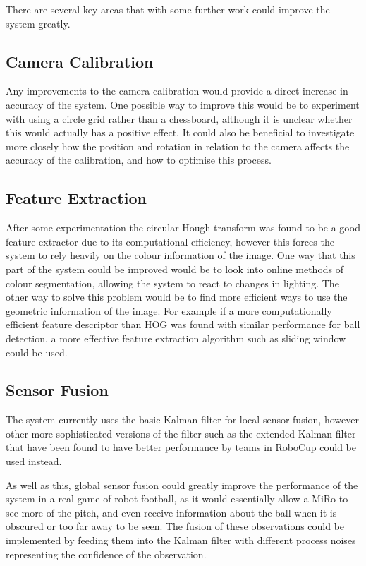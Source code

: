 There are several key areas that with some further work could improve the system greatly.

\subsection{Camera Calibration}

Any improvements to the camera calibration would provide a direct increase in accuracy of the system. One possible way to improve this would be to experiment with using a circle grid rather than a chessboard, although it is unclear whether this would actually has a positive effect. It could also be beneficial to investigate more closely how the position and rotation in relation to the camera affects the accuracy of the calibration, and how to optimise this process.

\subsection{Feature Extraction}

After some experimentation the circular Hough transform was found to be a good feature extractor due to its computational efficiency, however this forces the system to rely heavily on the colour information of the image. One way that this part of the system could be improved would be to look into online methods of colour segmentation, allowing the system to react to changes in lighting. The other way to solve this problem would be to find more efficient ways to use the geometric information of the image. For example if a more computationally efficient feature descriptor than HOG was found with similar performance for ball detection, a more effective feature extraction algorithm such as sliding window could be used. 

\subsection{Sensor Fusion}

The system currently uses the basic Kalman filter for local sensor fusion, however other more sophisticated versions of the filter such as the extended Kalman filter that have been found to have better performance by teams in RoboCup could be used instead. 

As well as this, global sensor fusion could greatly improve the performance of the system in a real game of robot football, as it would essentially allow a MiRo to see more of the pitch, and even receive information about the ball when it is obscured or too far away to be seen. The fusion of these observations could be implemented by feeding them into the Kalman filter with different process noises representing the confidence of the observation. 
